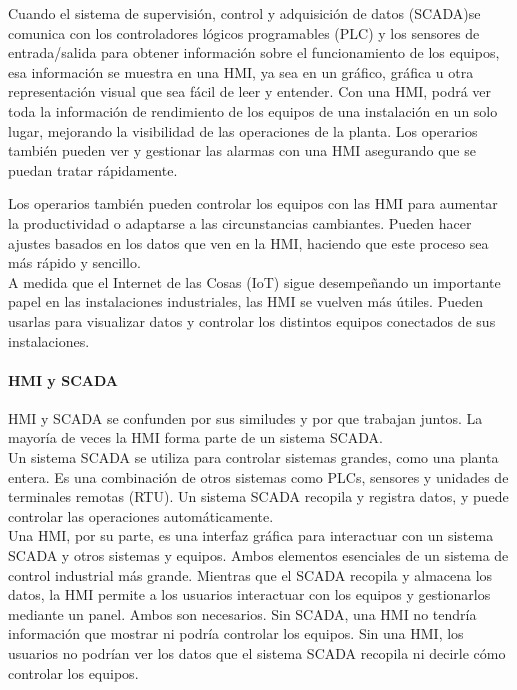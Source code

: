 \documentclass[12pt,titlepage]{article}
\begin{document}
Cuando el sistema de supervisión, control y adquisición de datos (SCADA)se comunica con los controladores lógicos programables (PLC) y los sensores de entrada/salida para obtener información sobre el funcionamiento de los equipos, esa información se muestra en una HMI, ya sea en un gráfico, gráfica u otra representación visual que sea fácil de leer y entender. Con una HMI, podrá ver toda la información de rendimiento de los equipos de una instalación en un solo lugar, mejorando la visibilidad de las operaciones de la planta.  Los operarios también pueden ver y gestionar las alarmas con una HMI asegurando que se puedan tratar rápidamente. 
\newpage

Los operarios también pueden controlar los equipos con las HMI para aumentar la productividad o adaptarse a las circunstancias cambiantes. Pueden hacer ajustes basados en los datos que ven en la HMI, haciendo que este proceso sea más rápido y sencillo. \\

A medida que el Internet de las Cosas (IoT) sigue desempeñando un importante papel en las instalaciones industriales, las HMI se vuelven más útiles. Pueden usarlas para visualizar datos y controlar los distintos equipos conectados de sus instalaciones. \\

\paragraph{HMI y SCADA}\leavevmode\newline
 HMI y SCADA se confunden por sus similudes y por que trabajan juntos. La mayoría de veces la HMI forma parte de un sistema SCADA.\\
 
Un sistema SCADA se utiliza para controlar sistemas grandes, como una planta entera. Es una combinación de otros sistemas como PLCs, sensores y unidades de terminales remotas (RTU). Un sistema SCADA recopila y registra datos, y puede controlar las operaciones automáticamente. \\ 

Una HMI, por su parte, es una interfaz gráfica para interactuar con un sistema SCADA y otros sistemas y equipos. Ambos elementos esenciales de un sistema de control industrial más grande. Mientras que el SCADA recopila y almacena los datos, la HMI permite a los usuarios interactuar con los equipos y gestionarlos mediante un panel. Ambos son necesarios. Sin SCADA, una HMI no tendría información que mostrar ni podría controlar los equipos. Sin una HMI, los usuarios no podrían ver los datos que el sistema SCADA recopila ni decirle cómo controlar los equipos. \\ 
\end{document}
